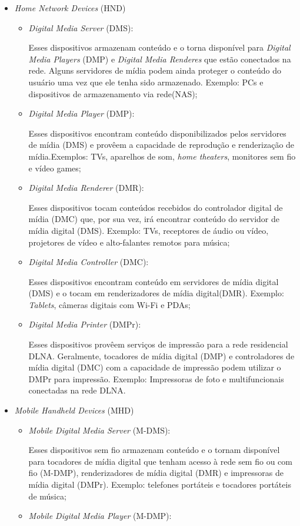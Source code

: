 \begin{itemize}
	\item \emph{Home Network Devices} (HND)
	\begin{itemize}
		\item \emph{Digital Media Server} (DMS): 

		Esses dispositivos armazenam conteúdo e o torna disponível para \emph{Digital Media Players} (DMP) e \emph{Digital Media Renderes} que estão conectados na rede. Alguns servidores de mídia podem ainda proteger o conteúdo do usuário uma vez que ele tenha sido armazenado. Exemplo: PCs e dispositivos de armazenamento via rede(NAS);
		\item \emph{Digital Media Player} (DMP): 

		Esses dispositivos encontram conteúdo disponibilizados pelos servidores de mídia (DMS) e provêem a capacidade de reprodução e renderização de mídia.Exemplos: TVs, aparelhos de som, \emph{home theaters}, monitores sem fio e vídeo games;
		\item \emph{Digital Media Renderer} (DMR): 

		Esses dispositivos tocam conteúdos recebidos do controlador digital de mídia (DMC) que, por sua vez, irá encontrar conteúdo do servidor de mídia digital (DMS). Exemplo: TVs, receptores de áudio ou vídeo, projetores de vídeo e alto-falantes remotos para música;
		\item \emph{Digital Media Controller} (DMC): 

		Esses dispositivos encontram conteúdo em servidores de mídia digital (DMS) e o tocam em renderizadores de mídia digital(DMR). Exemplo: \emph{Tablets}, câmeras digitais com Wi-Fi e PDAs;
		\item \emph{Digital Media Printer} (DMPr): 

		Esses dispositivos provêem serviços de impressão para a rede residencial DLNA. Geralmente, tocadores de mídia digital (DMP) e controladores de mídia digital (DMC) com a capacidade de impressão podem utilizar o DMPr para impressão. Exemplo: Impressoras de foto e multifuncionais conectadas na rede DLNA.
	\end{itemize}
	\item \emph{Mobile Handheld Devices} (MHD)
	\begin{itemize}
		\item \emph{Mobile Digital Media Server} (M-DMS): 

		Esses dispositivos sem fio armazenam conteúdo e o tornam disponível para tocadores de mídia digital que tenham acesso à rede sem fio ou com fio (M-DMP), renderizadores de mídia digital (DMR) e impressoras de mídia digital (DMPr). Exemplo: telefones portáteis e tocadores portáteis de música;
		\item \emph{Mobile Digital Media Player} (M-DMP): 


\end{itemize}
\end{itemize}
